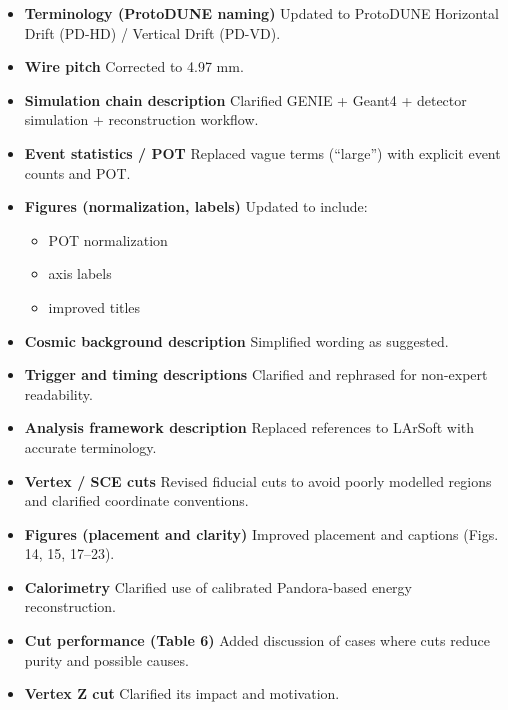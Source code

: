 \documentclass[11pt]{article}
\begin{document}
\begin{itemize}[leftmargin=*]

\item \textbf{Terminology (ProtoDUNE naming)}  
Updated to ProtoDUNE Horizontal Drift (PD-HD) / Vertical Drift (PD-VD).

\item \textbf{Wire pitch}  
Corrected to 4.97 mm.

\item \textbf{Simulation chain description}  
Clarified GENIE + Geant4 + detector simulation + reconstruction workflow.

\item \textbf{Event statistics / POT}  
Replaced vague terms (``large'') with explicit event counts and POT.

\item \textbf{Figures (normalization, labels)}  
Updated to include:
\begin{itemize}
\item POT normalization
\item axis labels
\item improved titles
\end{itemize}

\item \textbf{Cosmic background description}  
Simplified wording as suggested.

\item \textbf{Trigger and timing descriptions}  
Clarified and rephrased for non-expert readability.

\item \textbf{Analysis framework description}  
Replaced references to LArSoft with accurate terminology.

\item \textbf{Vertex / SCE cuts}  
Revised fiducial cuts to avoid poorly modelled regions and clarified coordinate conventions.

\item \textbf{Figures (placement and clarity)}  
Improved placement and captions (Figs. 14, 15, 17--23).

\item \textbf{Calorimetry}  
Clarified use of calibrated Pandora-based energy reconstruction.

\item \textbf{Cut performance (Table 6)}  
Added discussion of cases where cuts reduce purity and possible causes.

\item \textbf{Vertex Z cut}  
Clarified its impact and motivation.

\end{itemize}
\end{document}
